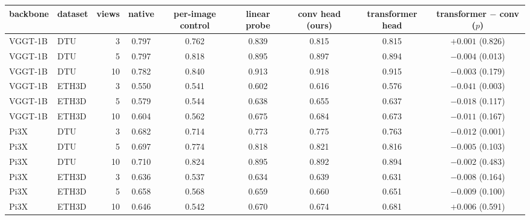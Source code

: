 \begin{tabular}{llrcccccc}
\toprule
backbone & dataset & views & native & per-image control & linear probe & conv head (ours) & transformer head & transformer $-$ conv ($p$) \\
\midrule
VGGT-1B & DTU & 3 & 0.797 & 0.762 & 0.839 & 0.815 & 0.815 & $+0.001$ (0.826) \\
VGGT-1B & DTU & 5 & 0.797 & 0.818 & 0.895 & 0.897 & 0.894 & $-0.004$ (0.013) \\
VGGT-1B & DTU & 10 & 0.782 & 0.840 & 0.913 & 0.918 & 0.915 & $-0.003$ (0.179) \\
VGGT-1B & ETH3D & 3 & 0.550 & 0.541 & 0.602 & 0.616 & 0.576 & $-0.041$ (0.003) \\
VGGT-1B & ETH3D & 5 & 0.579 & 0.544 & 0.638 & 0.655 & 0.637 & $-0.018$ (0.117) \\
VGGT-1B & ETH3D & 10 & 0.604 & 0.562 & 0.675 & 0.684 & 0.673 & $-0.011$ (0.167) \\
\midrule
Pi3X & DTU & 3 & 0.682 & 0.714 & 0.773 & 0.775 & 0.763 & $-0.012$ (0.001) \\
Pi3X & DTU & 5 & 0.697 & 0.774 & 0.818 & 0.821 & 0.816 & $-0.005$ (0.103) \\
Pi3X & DTU & 10 & 0.710 & 0.824 & 0.895 & 0.892 & 0.894 & $-0.002$ (0.483) \\
Pi3X & ETH3D & 3 & 0.636 & 0.537 & 0.634 & 0.639 & 0.631 & $-0.008$ (0.164) \\
Pi3X & ETH3D & 5 & 0.658 & 0.568 & 0.659 & 0.660 & 0.651 & $-0.009$ (0.100) \\
Pi3X & ETH3D & 10 & 0.646 & 0.542 & 0.670 & 0.674 & 0.681 & $+0.006$ (0.591) \\
\bottomrule
\end{tabular}
